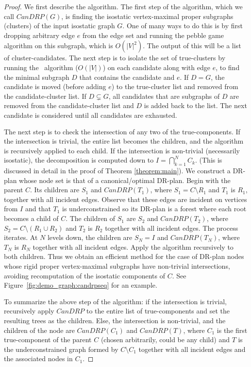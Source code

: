 \begin{proof}
We first describe the algorithm.
The first step of the algorithm, which we call $CanDRP(G)$, is finding the isostatic vertex-maximal proper subgraphs (clusters) of the input isostatic graph $G$. One of many ways to do this is  by first dropping arbitrary edge $e$ from the edge set and running the pebble game algorithm \cite{Jacobs:1997:PG} on this subgraph, which is $O(|V|^2)$. The output of this will be a list of cluster-candidates. The next step is to isolate the set of true-clusters by running the \frontier\ algorithm \cite{hoffman2001decompositionII} \cite{lomonosov2004graph} ($O(|V|)$) on each candidate along with edge $e$, to find the minimal subgraph $D$ that contains the candidate and $e$. If $D=G$, the candidate is moved (before adding $e$) to the true-cluster list and removed from the candidate-cluster list. If $D\subsetneq G$, all candidates that are subgraphs of $D$ are removed from the candidate-cluster list and $D$ is added back to the list.  The next candidate is considered until all candidates are exhausted.

The next step is to check the intersection of any two of the true-components. If the intersection is trivial, the entire list becomes the children, and the algorithm is recursively applied to each child. If the intersection is non-trivial (necessarily isostatic), the  decomposition is computed down to $I=\bigcap_{k=1}^{N}{C_k}$. (This is discussed in detail in the proof of Theorem \ref{theorem:main}). We construct a DR-plan whose node set is that of a canonical/optimal DR-plan. Begin with the parent $C$. Its children are $S_1$ and $CanDRP(T_1)$, where $S_1=C\setminus R_1$ and $T_1$ is $R_1$, together with all incident edges. Observe that these edges are incident on vertices from $I$ and that $T_1$ is underconstrained so its DR-plan is a forest where each root becomes a child of $C$. The children of $S_1$ are $S_2$ and $CanDRP(T_2)$, where $S_2=C\setminus (R_1\cup R_2)$ and $T_2$ is $R_2$ together with all incident edges. The process iterates. At $N$ levels down, the children are  $S_N=I$ and $CanDRP(T_N)$, where $T_N$ is $R_N$ together with all incident edges. Apply the algorithm recursively to both children.
Thus we obtain an efficient method for the case of DR-plan nodes whose rigid proper vertex-maximal subgraphs have non-trivial intersections, avoiding recomputation of the isostatic components of $C$.
See Figure~\ref{fig:demo_graph:candrpseq} for an example.

To summarize the above step of the algorithm:
if the intersection is trivial, recursively apply $CanDRP$ to the entire list of true-components and set the resulting trees as the children. Else, the intersection is non-trivial, and the children of the node are $CanDRP(C_1)$ and $CanDRP(T)$, where $C_1$ is the first true-component of the parent $C$ (chosen arbitrarily, could be any child) and $T$ is the underconstrained graph formed by $C\setminus C_1$ together with all incident edges  and the associated nodes in $C_1$.


\end{proof}

